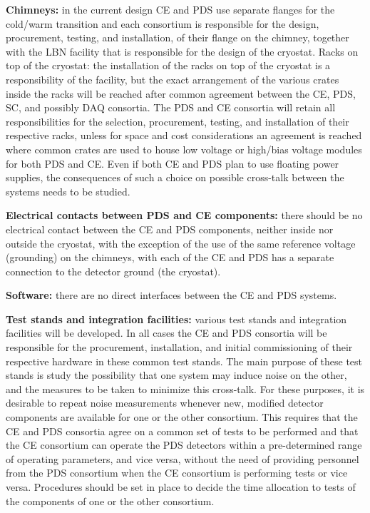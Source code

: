 \textbf{Chimneys: }in the current design CE and PDS use separate flanges for the cold/warm transition and each consortium is responsible for the design, procurement, testing, and installation, of their flange on the chimney, together with the LBN facility that is responsible for the design of the cryostat.
Racks on top of the cryostat: the installation of the racks on top of the cryostat is a responsibility of the facility, but the exact arrangement of the various crates inside the racks will be reached after common agreement between the CE, PDS, SC, and possibly DAQ consortia. The PDS and CE consortia will retain all responsibilities for the selection, procurement, testing, and installation of their respective racks, unless for space and cost considerations an agreement is reached where common crates are used to house low voltage or high/bias voltage modules for both PDS and CE. Even if both CE and PDS plan to use floating power supplies, the consequences of such a choice on possible cross-talk between the systems needs to be studied. 

\textbf{Electrical contacts between PDS and CE components:} there should be no electrical contact between the CE and PDS components, neither inside nor outside the cryostat, with the exception of the use of the same reference voltage (grounding) on the chimneys, with each of the CE and PDS has a separate connection to the detector ground (the cryostat).

\textbf{Software:} there are no direct interfaces between the CE and PDS systems. 

\textbf{Test stands and integration facilities: }various test stands and integration facilities will be developed. In all cases the CE and PDS consortia will be responsible for the procurement, installation, and initial commissioning of their respective hardware in these common test stands. The main purpose of these test stands is study the possibility that one system may induce noise on the other, and the measures to be taken to minimize this cross-talk. For these purposes, it is desirable to repeat noise measurements whenever new, modified detector components are available for one or the other consortium. This requires that the CE and PDS consortia agree on a common set of tests to be performed and that the CE consortium can operate the PDS detectors within a pre-determined range of operating parameters, and vice versa, without the need of providing personnel from the PDS consortium when the CE consortium is performing tests or vice versa. Procedures should be set in place to decide the time allocation to tests of the components of one or the other consortium.

